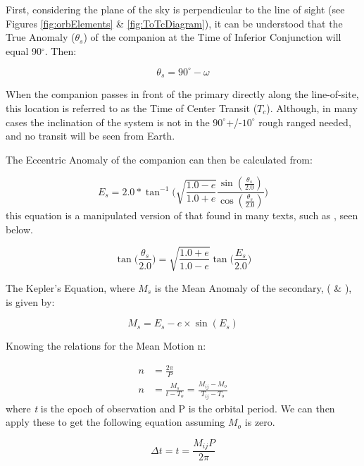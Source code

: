 \documentclass[12pt,preprint]{aastex}
\begin{document}
First, considering the plane of the sky is perpendicular to the line of sight (see Figures \ref{fig:orbElements} \& \ref{fig:ToTcDiagram}), it can be understood that the True Anomaly ($\theta_s$) of the companion at the Time of Inferior Conjunction will equal 90$^{\circ}$.  Then:

\begin{equation}\label{eq:one}
\theta_s = 90^{\circ}-\omega
\end{equation}

When the companion passes in front of the primary directly along the line-of-site, this location is referred to as the Time of Center Transit ($T_c$).  Although, in many cases the inclination of the system is not in the $90^{\circ}$+/-$10^{\circ}$ rough ranged needed, and no transit will be seen from Earth.

The Eccentric Anomaly of the companion can then be calculated from:

\begin{equation}
E_s = 2.0*\tan^{-1} \bigg( \sqrt{\frac{1.0-e}{1.0+e}} \frac{\sin(\frac{\theta_s}{2.0})}{\cos(\frac{\theta_s}{2.0})} \bigg)
\end{equation}
this equation is a manipulated version of that found in many texts, such as \citet{heintz}, seen below.

\begin{equation}
\tan\bigg( \frac{\theta_s}{2.0}  \bigg) = \sqrt{\frac{1.0+e}{1.0-e}} \tan\bigg( \frac{E_s}{2.0} \bigg)
\end{equation}

The Kepler's Equation, where $M_s$ is the Mean Anomaly of the secondary, (\citet{heintz} \& \citet{hilditch}), is given by:

\begin{equation}
M_s = E_s-e\times \sin(E_s)  
\end{equation}

Knowing the relations for the Mean Motion n:

\begin{subequations}
\begin{align}
n &= \frac{2\pi}{P}\\
n &=\frac{M_s}{t-T_o}=\frac{M_{ij}-M_{o}}{T_{ij}-T_o} 
\end{align}
\end{subequations}
where {\it t} is the epoch of observation and P is the orbital period.
We can then apply these to get the following equation assuming $M_{o}$ is zero.

\begin{equation}\label{eq:five}
\Delta t =t = \frac{M_{ij}P}{2\pi}
\end{equation}
\end{document}
